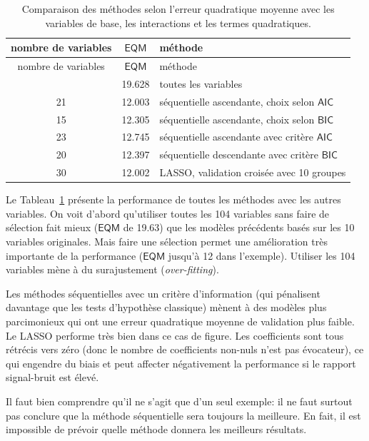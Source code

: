 \documentclass[
  11pt,
  letterpaper,
]{scrbook}
\theoremstyle{definition}
\theoremstyle{remark}
\begin{document}
\begin{longtable}[]{@{}ccl@{}}
\caption{Comparaison des méthodes selon l'erreur quadratique moyenne
avec les variables de base, les interactions et les termes
quadratiques.}\label{tbl-02-modelcomparaisonfull}\tabularnewline
\toprule\noalign{}
nombre de variables & \(\mathsf{EQM}\) & méthode \\
\midrule\noalign{}
\endfirsthead
\toprule\noalign{}
nombre de variables & \(\mathsf{EQM}\) & méthode \\
\midrule\noalign{}
\endhead
\bottomrule\noalign{}
\endlastfoot
104 & 19.628 & toutes les variables \\
21 & 12.003 & séquentielle ascendante, choix selon \(\mathsf{AIC}\) \\
15 & 12.305 & séquentielle ascendante, choix selon \(\mathsf{BIC}\) \\
23 & 12.745 & séquentielle ascendante avec critère \(\mathsf{AIC}\) \\
20 & 12.397 & séquentielle descendante avec critère \(\mathsf{BIC}\) \\
30 & 12.002 & LASSO, validation croisée avec 10 groupes \\
\end{longtable}

Le Tableau~\ref{tbl-02-modelcomparaisonfull} présente la performance de
toutes les méthodes avec les autres variables. On voit d'abord
qu'utiliser toutes les 104 variables sans faire de sélection fait mieux
(\(\mathsf{EQM}\) de 19.63) que les modèles précédents basés sur les 10
variables originales. Mais faire une sélection permet une amélioration
très importante de la performance (\(\mathsf{EQM}\) jusqu'à 12 dans
l'exemple). Utiliser les 104 variables mène à du surajustement
(\emph{over-fitting}).

Les méthodes séquentielles avec un critère d'information (qui pénalisent
davantage que les tests d'hypothèse classique) mènent à des modèles plus
parcimonieux qui ont une erreur quadratique moyenne de validation plus
faible. Le LASSO performe très bien dans ce cas de figure. Les
coefficients sont tous rétrécis vers zéro (donc le nombre de
coefficients non-nuls n'est pas évocateur), ce qui engendre du biais et
peut affecter négativement la performance si le rapport signal-bruit est
élevé.

Il faut bien comprendre qu'il ne s'agit que d'un seul exemple: il ne
faut surtout pas conclure que la méthode séquentielle sera toujours la
meilleure. En fait, il est impossible de prévoir quelle méthode donnera
les meilleurs résultats.
\end{document}
